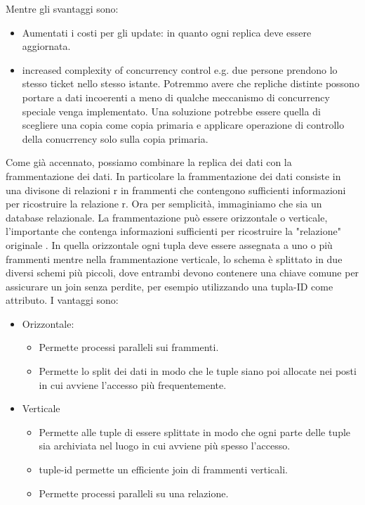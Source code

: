 \documentclass[a4page, 11pt]{article}
\begin{document}
Mentre gli svantaggi sono:

\begin{itemize}[noitemsep]
	 
	\item
	Aumentati i costi per gli update: in quanto ogni replica deve essere aggiornata.
	\item
	increased complexity of concurrency control e.g. due persone prendono lo stesso ticket nello stesso istante. Potremmo avere che repliche distinte possono portare a dati incoerenti a meno di qualche meccanismo di concurrency speciale venga implementato. Una soluzione potrebbe essere quella di scegliere una copia come copia primaria e applicare operazione di controllo della conucrrency solo sulla copia primaria.
\end{itemize}
Come già accennato, possiamo combinare la replica dei dati con la frammentazione dei dati. In particolare la frammentazione dei dati consiste in una divisone di relazioni r in frammenti che contengono sufficienti informazioni per ricostruire la relazione r.
Ora per semplicità, immaginiamo che sia un database relazionale. 
La frammentazione può essere orizzontale o verticale, l'importante che contenga informazioni sufficienti per ricostruire la "relazione" originale . In quella orizzontale ogni tupla deve essere assegnata a uno o più frammenti mentre nella frammentazione verticale, lo schema è splittato in due diversi schemi più piccoli, dove entrambi devono contenere una chiave comune per assicurare un join senza perdite, per esempio utilizzando una tupla-ID come attributo.\newline
I vantaggi sono:
\begin{itemize}[noitemsep]
	\item Orizzontale:
	\begin{itemize}[noitemsep]
		\item Permette processi paralleli sui frammenti.
		\item Permette lo split dei dati in modo che le tuple siano poi allocate nei posti in cui avviene l'accesso più frequentemente.
	\end{itemize}
	\item Verticale
	\begin{itemize}[noitemsep]
		\item Permette alle tuple di essere splittate in modo che ogni parte delle tuple sia archiviata nel luogo in cui avviene più spesso l'accesso.
		\item tuple-id permette un efficiente join di frammenti verticali.
		\item Permette processi paralleli su una relazione.
	\end{itemize}
\end{itemize}
\end{document}
